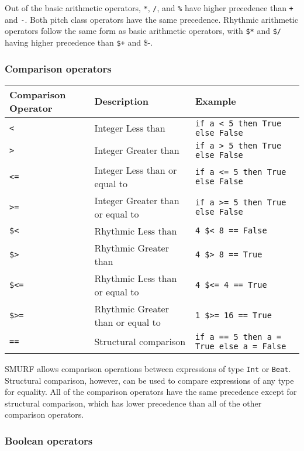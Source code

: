 Out of the basic arithmetic operators, \texttt{*}, \texttt{/}, and \texttt{\%} 
have higher precedence than \texttt{+} and \texttt{-}. 
Both pitch class operators have the same precedence. 
Rhythmic arithmetic operators follow the same form as basic arithmetic operators, with
\texttt{\$*} and \texttt{\$/} having higher precedence than \texttt{\$+} and {\$-}.

\subsubsection{Comparison operators}

\begin{table} [H]
\centering
\begin{tabularx}{\textwidth}{XlX}
\hline\hline
Comparison Operator & Description & Example \\
\hline\hline
  \texttt{<}  & Integer Less than & \texttt{if a < 5 then True else False} \\ \hline
  \texttt{>}  & Integer Greater than & \texttt{if a > 5 then True else False}  \\ \hline
  \texttt{<=}  & Integer Less than or equal to & \texttt{if a <= 5 then True else False} \\ \hline
  \texttt{>=} & Integer Greater than or equal to & \texttt{if a >= 5 then True else False} \\ \hline
  \texttt{\$<} & Rhythmic Less than & \texttt{4 \$< 8 == False} \\ \hline
  \texttt{\$>}  & Rhythmic Greater than &  \texttt{4 \$> 8 == True}  \\ \hline
  \texttt{\$<=} & Rhythmic Less than or equal to & \texttt{4 \$<= 4 == True} \\ \hline
  \texttt{\$>=} & Rhythmic Greater than or equal to &  \texttt{1 \$>= 16 == True} \\ \hline
  \texttt{==} & Structural comparison & \texttt{if a == 5 then a = True else a = False} \\ \hline
\end{tabularx}
\end{table}

SMURF allows comparison operations between expressions of type \texttt{Int} or \texttt{Beat}.
Structural comparison, however, can be used to compare expressions of any type for equality.
All of the comparison operators have the same precedence except for structural comparison, which
has lower precedence than all of the other comparison operators.

\subsubsection{Boolean operators}


